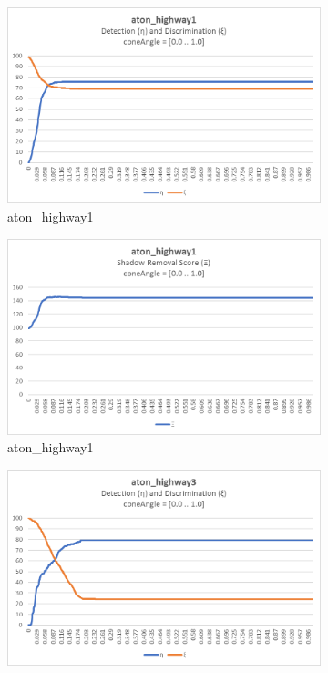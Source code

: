 \begin{appendices}
\begin{figure}
  \begin{subfigure}{.45\linewidth}
  \includegraphics[width=1\linewidth]{figures/appendix/highway1_coneAngle_response.jpg}
  \caption{aton\_highway1}
\end{subfigure}
\hfill
\begin{subfigure}{.45\linewidth}
  \includegraphics[width=1\linewidth]{figures/appendix/highway1_coneAngle_score.jpg}
  \caption{aton\_highway1}
\end{subfigure}
\hfill
\begin{subfigure}{.45\linewidth}
  \includegraphics[width=1\linewidth]{figures/appendix/highway3_coneAngle_response.jpg}

\end{subfigure}
\end{figure}
\end{appendices}
